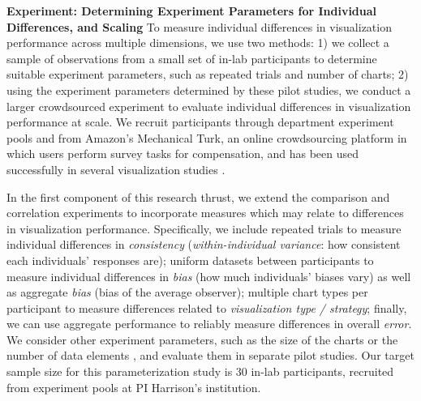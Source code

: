 \documentclass[11pt]{article}
\begin{document}

\noindent\textbf{Experiment: Determining Experiment Parameters for Individual Differences, and Scaling}
To measure individual differences in visualization performance across multiple dimensions, we use two methods: 1) we collect a sample of observations from a small set of in-lab participants to determine suitable experiment parameters, such as repeated trials and number of charts; 2) using the experiment parameters determined by these pilot studies, we conduct a larger crowdsourced experiment to evaluate individual differences in visualization performance at scale.
We recruit participants through department experiment pools and from Amazon's Mechanical Turk, an online crowdsourcing platform in which users perform survey tasks for compensation, and has been used successfully in several visualization studies \cite{heer2010crowdsourcing, hullman2011impact, skau2016judgment, harrison2014ranking, feng2017hindsight, harrison2013influencing}.

In the first component of this research thrust, we extend the comparison and correlation experiments to incorporate measures which may relate to differences in visualization performance.
Specifically, we include repeated trials to measure individual differences in \emph{consistency} (\ie \emph{within-individual variance}: how consistent each individuals' responses are); uniform datasets between participants to measure individual differences in \emph{bias} (\ie how much individuals' biases vary) as well as aggregate \emph{bias} (\ie bias of the average observer); multiple chart types per participant to measure differences related to \emph{visualization type / strategy}; finally, we can use aggregate performance to reliably measure differences in overall \emph{error}. 
We consider other experiment parameters, such as the size of the charts \eg \cite{cleveland1982variables} or the number of data elements \eg \cite{skau2016judgment}, and evaluate them in separate pilot studies.
Our target sample size for this parameterization study is 30 in-lab participants, recruited from experiment pools at PI Harrison's institution.
\end{document}
